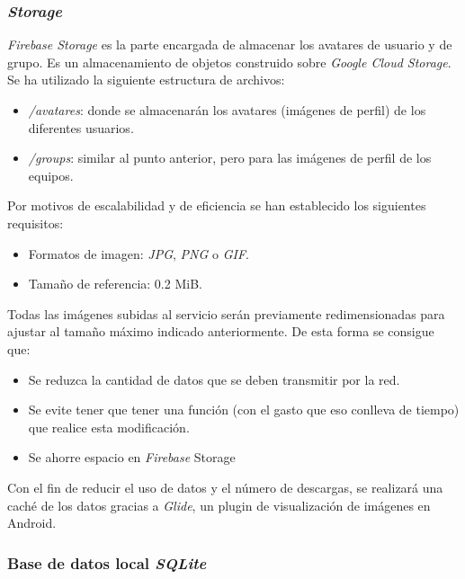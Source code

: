 \documentclass[twoside]{report}
\begin{document}
\subsubsection{\textit{Storage}}

\textit{Firebase Storage} es la parte encargada de almacenar los avatares de usuario y de grupo. Es un almacenamiento de objetos construido sobre \textit{Google Cloud Storage}. \\

Se ha utilizado la siguiente estructura de archivos:
\begin{itemize}

\item \textit{/avatares}: donde se almacenarán los avatares (imágenes de perfil) de los diferentes usuarios. 

\item \textit{/groups}: similar al punto anterior, pero para las imágenes de perfil de los equipos. 

\end{itemize}

Por motivos de escalabilidad y de eficiencia se han establecido los siguientes requisitos:
\begin{itemize}
\item Formatos de imagen: \textit{JPG}, \textit{PNG} o \textit{GIF}.
\item Tamaño de referencia: 0.2 MiB.
\end{itemize}

Todas las imágenes subidas al servicio serán previamente redimensionadas para ajustar al tamaño máximo indicado anteriormente. De esta forma se consigue que:

\begin{itemize}
\item Se reduzca la cantidad de datos que se deben transmitir por la red.
\item Se evite tener que tener una función (con el gasto que eso conlleva de tiempo) que realice esta modificación.
\item Se ahorre espacio en \textit{Firebase} Storage
\end{itemize}

Con el fin de reducir el uso de datos y el número de descargas, se realizará una caché de los datos gracias a \textit{Glide}, un plugin de visualización de imágenes en Android.

\subsubsection{Base de datos local \textit{SQLite}}
\end{document}
